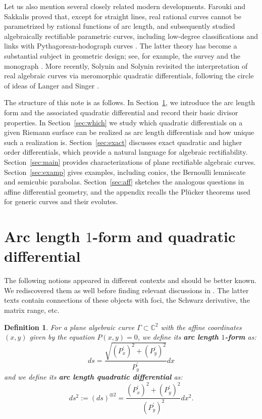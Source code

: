\documentclass[reqno]{amsart}
\newtheorem{definition}{Definition}
\newcommand{\bC}{\mathbb{C}}
\newcommand {\Ga}{\Gamma}
\theoremstyle{definition}
\theoremstyle{remark}
\theoremstyle{definition}
\theoremstyle{definition}
\theoremstyle{definition}
\begin{document}
\medskip
Let us also mention several closely related modern developments. Farouki and Sakkalis proved that, except for straight lines, real rational curves cannot be parametrized by rational functions of arc length, and subsequently studied algebraically rectifiable parametric curves, including low-degree classifications and links with Pythagorean-hodograph curves \cite{FaSa91,SaFa}.  The latter theory has become a substantial subject in geometric design; see, for example, the survey \cite{KoLa14} and the monograph \cite{Fa08}.  More recently, Solynin and Solynin revisited the interpretation of real algebraic curves via meromorphic quadratic differentials, following the circle of ideas of Langer and Singer \cite{LaSi1,SoSo22}.

\medskip 
The structure of this note is as follows. In Section~\ref{sec:arc}, we introduce the arc length form and the associated quadratic differential and record their basic divisor properties. In Section~\ref{sec:which} we study which quadratic differentials on a given Riemann surface can be realized as arc length differentials and how unique such a realization is. Section~\ref{sec:exact} discusses exact quadratic and higher order differentials, which provide a natural language for algebraic rectifiability. Section~\ref{sec:main} provides characterizations of plane rectifiable algebraic curves. Section~\ref{sec:examp} gives examples, including conics, the Bernoulli lemniscate and semicubic parabolas. Section~\ref{sec:aff} sketches the analogous questions in affine differential geometry, and the appendix recalls the Pl\"ucker theorems used for generic curves and their evolutes.



\section{Arc length $1$-form and quadratic differential} \label{sec:arc}

The following notions appeared in different contexts and should be better known.  We  rediscovered them as well before finding   relevant discussions in \cite{LaSi1,LaSi2,LaSi3, La}. The latter texts contain connections of these objects  with foci, the Schwarz derivative, the matrix range, etc.

\begin{definition}  For a plane algebraic curve $\Ga \subset \bC^2$ with the affine coordinates $(x,y)$ given by the equation $P(x,y)=0$, we define its {\bf arc length $1$-form}  as:  $$ds=\frac{\sqrt{(P_x^{\prime})^2+(P_y^\prime)^2}}{P^\prime_y}dx$$
 and we define its  {\bf arc length quadratic differential} as: $$ds^2:=(ds)^{\otimes 2}=\frac{(P_x^{\prime})^2+(P_y^\prime)^2}{(P^\prime_y)^2}dx^2.$$
  \end{definition}
\end{document}
